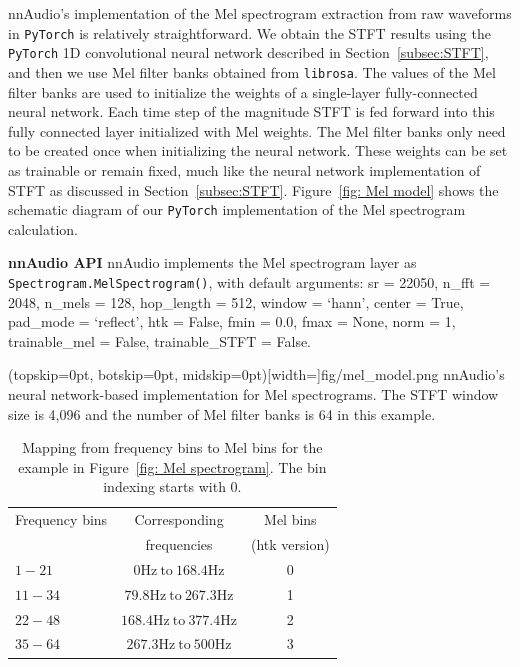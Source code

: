 \documentclass{ieeeaccess}
\newcommand{\nbh}[1]{\texttt{#1}}
\begin{document}
nnAudio's implementation of the Mel spectrogram extraction from raw waveforms in \nbh{PyTorch} is relatively straightforward. We obtain the STFT results using the \nbh{PyTorch} 1D convolutional neural network described in Section~\ref{subsec:STFT}, and then we use Mel filter banks obtained from \nbh{librosa}. The values of the Mel filter banks are used to initialize the weights of a single-layer fully-connected neural network. Each time step of the magnitude STFT is fed forward into this fully connected layer initialized with Mel weights.  The Mel filter banks only need to be created once when initializing the neural network. These weights can be set as trainable or remain fixed, much like the neural network implementation of STFT as discussed in Section~\ref{subsec:STFT}. Figure~\ref{fig: Mel model} shows the schematic diagram of our \nbh{PyTorch} implementation of the Mel spectrogram calculation.

\hspace{11pt} 

\noindent \textbf{nnAudio API} nnAudio implements the Mel spectrogram layer as \nbh{Spectrogram.MelSpectrogram()}, with default arguments: sr = 22050, n\_fft = 2048, n\_mels = 128, hop\_length = 512, window = `hann', center = True, pad\_mode = `reflect', htk = False, fmin = 0.0, fmax = None, norm = 1, trainable\_mel = False, trainable\_STFT = False.

\Figure[t](topskip=0pt, botskip=0pt, midskip=0pt)[width=\linewidth]{fig/mel_model.png}
{nnAudio's neural network-based implementation for Mel spectrograms. The STFT window size is 4,096 and the number of Mel filter banks is 64 in this example.} \label{fig: Mel model}

\begin{table}\centering
\caption{Mapping from frequency bins to Mel bins for the example in Figure~\ref{fig: Mel spectrogram}. The bin indexing starts with 0.}
\label{tab:mel}
\setlength{\tabcolsep}{3pt}
\begin{tabular}{lcc}
\toprule
Frequency bins& 
Corresponding & 
Mel bins\\
&frequencies& (htk version)\\
\midrule
$1-21$& $0\text{Hz} \ \text{to}\ 168.4$Hz & 0 \\
$11-34$& $79.8\text{Hz} \ \text{to}\ 267.3$Hz & 1 \\
$22-48$& $168.4\text{Hz} \ \text{to}\ 377.4$Hz & 2 \\
$35-64$& $267.3\text{Hz} \ \text{to}\ 500$Hz & 3 \\
\bottomrule
\end{tabular}
\end{table}
\end{document}
